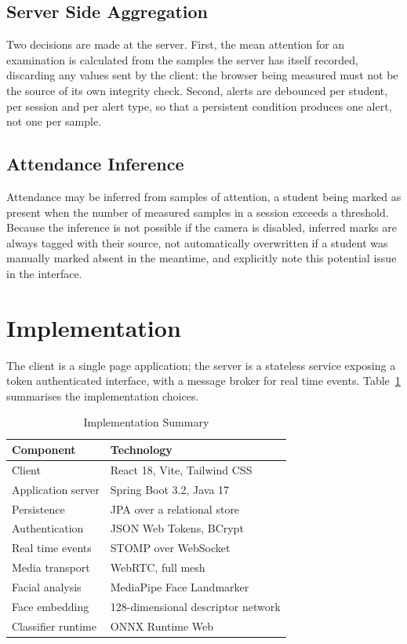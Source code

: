 \documentclass[conference]{IEEEtran}
\begin{document}
\subsection{Server Side Aggregation}

Two decisions are made at the server. First, the mean attention for an
examination is calculated from the samples the server has itself recorded,
discarding any values sent by the client: the browser being measured
must not be the source of its own integrity check. Second, alerts are
debounced per student, per session and per alert type, so that a persistent
condition produces one alert, not one per sample.

\subsection{Attendance Inference}

Attendance may be inferred from samples of attention, a student
being marked as present when the number of measured
samples in a session exceeds a threshold. Because the inference is
not possible if the camera is disabled, inferred marks are always
tagged with their source, not automatically overwritten if a student
was manually marked absent in the meantime, and explicitly note
this potential issue in the interface.

\section{Implementation}

The client is a single page application; the server is a stateless service exposing a token authenticated interface, with a message broker for real time events. Table~\ref{tab:stack} summarises the implementation choices.

\begin{table}[t]
\caption{Implementation Summary}
\label{tab:stack}
\centering
\begin{tabular}{|l|l|}
\hline
\textbf{Component} & \textbf{Technology} \\
\hline
Client & React 18, Vite, Tailwind CSS \\
\hline
Application server & Spring Boot 3.2, Java 17 \\
\hline
Persistence & JPA over a relational store \\
\hline
Authentication & JSON Web Tokens, BCrypt \\
\hline
Real time events & STOMP over WebSocket \\
\hline
Media transport & WebRTC, full mesh \\
\hline
Facial analysis & MediaPipe Face Landmarker \\
\hline
Face embedding & 128-dimensional descriptor network \\
\hline
Classifier runtime & ONNX Runtime Web \\
\hline
\end{tabular}
\end{table}
\end{document}
